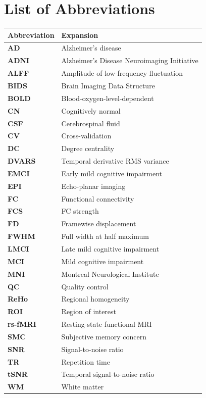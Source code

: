 \documentclass{ssnreview}
\newcommand{\hdr}{\rowcolor{SSNBlue!12}}                      %
\begin{document}
\chapter*{List of Abbreviations}
\begin{table}[H]
\centering
\small
\begin{tabular}{>{\bfseries}l@{\hspace{1.2cm}}l}
\toprule
\hdr Abbreviation & Expansion\\
\midrule
AD & Alzheimer's disease\\
ADNI & Alzheimer's Disease Neuroimaging Initiative\\
ALFF & Amplitude of low-frequency fluctuation\\
BIDS & Brain Imaging Data Structure\\
BOLD & Blood-oxygen-level-dependent\\
CN & Cognitively normal\\
CSF & Cerebrospinal fluid\\
CV & Cross-validation\\
DC & Degree centrality\\
DVARS & Temporal derivative RMS variance\\
EMCI & Early mild cognitive impairment\\
EPI & Echo-planar imaging\\
FC & Functional connectivity\\
FCS & FC strength\\
FD & Framewise displacement\\
FWHM & Full width at half maximum\\
LMCI & Late mild cognitive impairment\\
MCI & Mild cognitive impairment\\
MNI & Montreal Neurological Institute\\
QC & Quality control\\
ReHo & Regional homogeneity\\
ROI & Region of interest\\
rs-fMRI & Resting-state functional MRI\\
SMC & Subjective memory concern\\
SNR & Signal-to-noise ratio\\
TR & Repetition time\\
tSNR & Temporal signal-to-noise ratio\\
WM & White matter\\
\bottomrule
\end{tabular}
\end{table}
\end{document}
